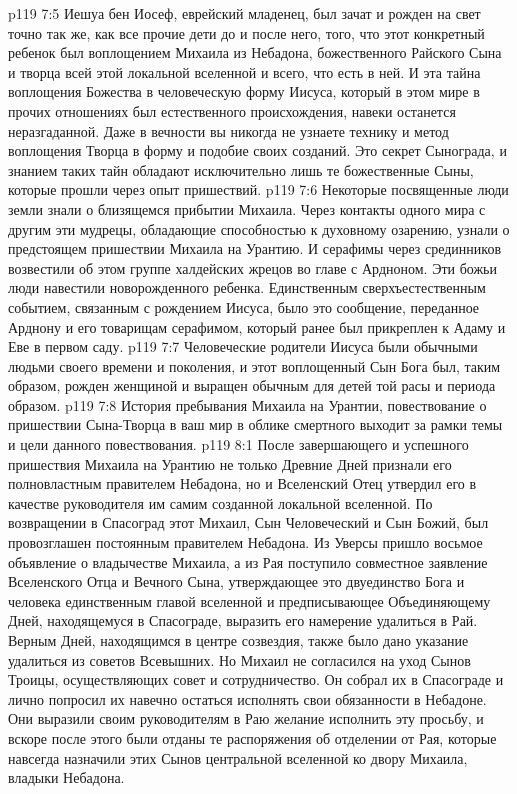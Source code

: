 \vs p119 7:5 Иешуа бен Иосеф, еврейский младенец, был зачат и рожден на свет точно так же, как все прочие дети до и после него,  того, что этот конкретный ребенок был воплощением Михаила из Небадона, божественного Райского Сына и творца всей этой локальной вселенной и всего, что есть в ней. И эта тайна воплощения Божества в человеческую форму Иисуса, который в этом мире в прочих отношениях был естественного происхождения, навеки останется неразгаданной. Даже в вечности вы никогда не узнаете технику и метод воплощения Творца в форму и подобие своих созданий. Это секрет Сынограда, и знанием таких тайн обладают исключительно лишь те божественные Сыны, которые прошли через опыт пришествий.
\vs p119 7:6 Некоторые посвященные люди земли знали о близящемся прибытии Михаила. Через контакты одного мира с другим эти мудрецы, обладающие способностью к духовному озарению, узнали о предстоящем пришествии Михаила на Урантию. И серафимы через срединников возвестили об этом группе халдейских жрецов во главе с Ардноном. Эти божьи люди навестили новорожденного ребенка. Единственным сверхъестественным событием, связанным с рождением Иисуса, было это сообщение, переданное Арднону и его товарищам серафимом, который ранее был прикреплен к Адаму и Еве в первом саду.
\vs p119 7:7 Человеческие родители Иисуса были обычными людьми своего времени и поколения, и этот воплощенный Сын Бога был, таким образом, рожден женщиной и выращен обычным для детей той расы и периода образом.
\vs p119 7:8 \pc История пребывания Михаила на Урантии, повествование о пришествии Сына\hyp{}Творца в ваш мир в облике смертного выходит за рамки темы и цели данного повествования.
\vs p119 8:1 После завершающего и успешного пришествия Михаила на Урантию не только Древние Дней признали его полновластным правителем Небадона, но и Вселенский Отец утвердил его в качестве руководителя им самим созданной локальной вселенной. По возвращении в Спасоград этот Михаил, Сын Человеческий и Сын Божий, был провозглашен постоянным правителем Небадона. Из Уверсы пришло восьмое объявление о владычестве Михаила, а из Рая поступило совместное заявление Вселенского Отца и Вечного Сына, утверждающее это двуединство Бога и человека единственным главой вселенной и предписывающее Объединяющему Дней, находящемуся в Спасограде, выразить его намерение удалиться в Рай. Верным Дней, находящимся в центре созвездия, также было дано указание удалиться из советов Всевышних. Но Михаил не согласился на уход Сынов Троицы, осуществляющих совет и сотрудничество. Он собрал их в Спасограде и лично попросил их навечно остаться исполнять свои обязанности в Небадоне. Они выразили своим руководителям в Раю желание исполнить эту просьбу, и вскоре после этого были отданы те распоряжения об отделении от Рая, которые навсегда назначили этих Сынов центральной вселенной ко двору Михаила, владыки Небадона.

